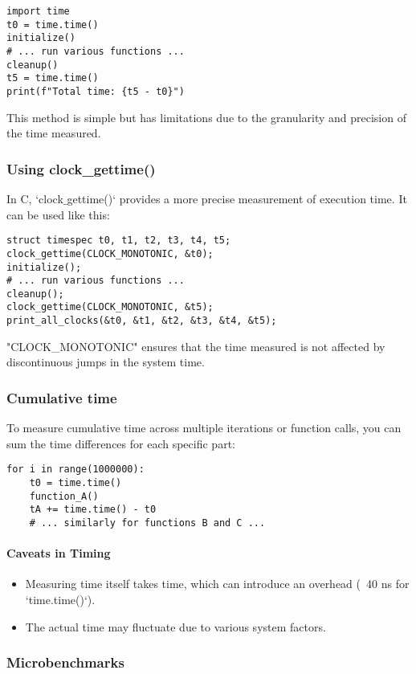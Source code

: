 \documentclass[12pt]{article}
\begin{document}
\begin{verbatim}
import time
t0 = time.time()
initialize()
# ... run various functions ...
cleanup()
t5 = time.time()
print(f"Total time: {t5 - t0}")
\end{verbatim}

This method is simple but has limitations due to the granularity and precision of the time measured.


\subsubsection{Using clock\_gettime()}
In C, `clock$\_$gettime()` provides a more precise measurement of execution time. It can be used like this:

\begin{verbatim}
struct timespec t0, t1, t2, t3, t4, t5;
clock_gettime(CLOCK_MONOTONIC, &t0);
initialize();
# ... run various functions ...
cleanup();
clock_gettime(CLOCK_MONOTONIC, &t5);
print_all_clocks(&t0, &t1, &t2, &t3, &t4, &t5);
\end{verbatim}

"CLOCK\_MONOTONIC" ensures that the time measured is not affected by discontinuous jumps in the system time.



\subsubsection{Cumulative time}
To measure cumulative time across multiple iterations or function calls, you can sum the time differences for each specific part:

\begin{verbatim}
for i in range(1000000):
    t0 = time.time()
    function_A()
    tA += time.time() - t0
    # ... similarly for functions B and C ...
\end{verbatim}

\paragraph{Caveats in Timing}
\begin{itemize}
    \item Measuring time itself takes time, which can introduce an overhead (~40 ns for `time.time()`).
    \item The actual time may fluctuate due to various system factors.
\end{itemize}

\subsubsection{Microbenchmarks}
\end{document}
